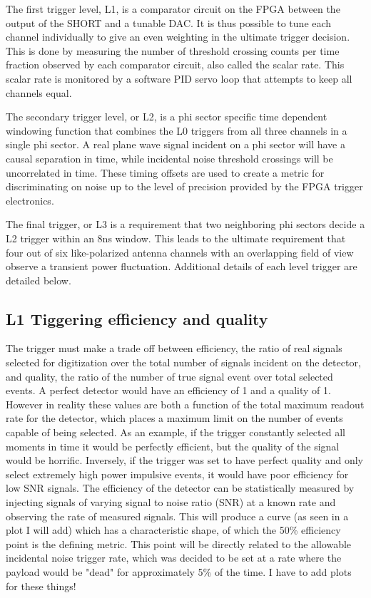 		The first trigger level, L1, is a comparator circuit on the FPGA between the output of the SHORT and a tunable DAC. It is thus possible to tune each channel individually to give an even weighting in the ultimate trigger decision.  This is done by measuring the number of threshold crossing counts per time fraction observed by each comparator circuit, also called the scalar rate.  This scalar rate is monitored by a software PID servo loop that attempts to keep all channels equal.
		
		The secondary trigger level, or L2, is a phi sector specific time dependent windowing function that combines the L0 triggers from all three channels in a single phi sector.  A real plane wave signal incident on a phi sector will have a causal separation in time, while incidental noise threshold crossings will be uncorrelated in time.  These timing offsets are used to create a metric for discriminating on noise up to the level of precision provided by the FPGA trigger electronics.  
		
		The final trigger, or L3 is a requirement that two neighboring phi sectors decide a L2 trigger within an 8ns window.  This leads to the ultimate requirement that four out of six like-polarized antenna channels with an overlapping field of view observe a transient power fluctuation.  Additional details of each level trigger are detailed below.
		

	\subsection{L1 Tiggering efficiency and quality}
		The trigger must make a trade off between efficiency, the ratio of real signals selected for digitization over the total number of signals incident on the detector, and quality, the ratio of the number of true signal event over total selected events.  A perfect detector would have an efficiency of 1 and a quality of 1.  However in reality these values are both a function of the total maximum readout rate for the detector, which places a maximum limit on the number of events capable of being selected.  As an example, if the trigger constantly selected all moments in time it would be perfectly efficient, but the quality of the signal would be horrific.  Inversely, if the trigger was set to have perfect quality and only select extremely high power impulsive events, it would have poor efficiency for low SNR signals.  The efficiency of the detector can be statistically measured by injecting signals of varying signal to noise ratio (SNR) at a known rate and observing the rate of measured signals.  This will produce a curve (as seen in a plot I will add) which has a characteristic shape, of which the 50\% efficiency point is the defining metric.  This point will be directly related to the allowable incidental noise trigger rate, which was decided to be set at a rate where the payload would be "dead" for approximately 5\% of the time.  I have to add plots for these things!
		
